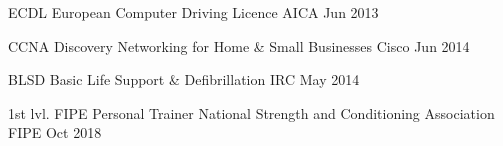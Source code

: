 

\begin{cvhonors}

	\cvhonor
	{ECDL}
	{European Computer Driving Licence}
	{AICA}
	{Jun 2013}
	
	\cvhonor
	{CCNA Discovery}
	{Networking for Home \& Small Businesses}
	{Cisco}
	{Jun 2014}
	
	\cvhonor
	{BLSD}
	{Basic Life Support \& Defibrillation}
	{IRC}
	{May 2014}

	\cvhonor
	{1st lvl. FIPE Personal Trainer}
	{National Strength and Conditioning Association}
	{FIPE}
	{Oct 2018}
	
\end{cvhonors}
